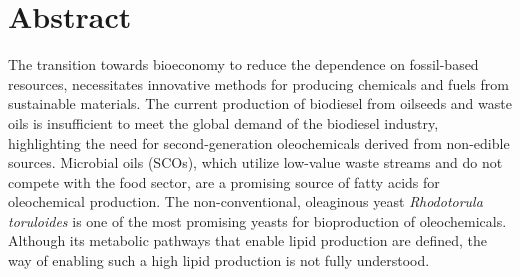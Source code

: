 \chapter*{Abstract}
{}




The transition towards bioeconomy to reduce the dependence on fossil-based resources, necessitates innovative methods for producing chemicals and fuels from sustainable materials. The current production of biodiesel from oilseeds and waste oils is insufficient to meet the global demand of the biodiesel industry, highlighting the need for second-generation oleochemicals derived from non-edible sources. Microbial oils (SCOs), which utilize low-value waste streams and do not compete with the food sector, are a promising source of fatty acids for oleochemical production.
The non-conventional, oleaginous yeast \textit{Rhodotorula toruloides} is one of the most promising yeasts for bioproduction of oleochemicals.
Although its metabolic pathways that enable lipid production are defined, the way of enabling such a high lipid production is not fully understood.


